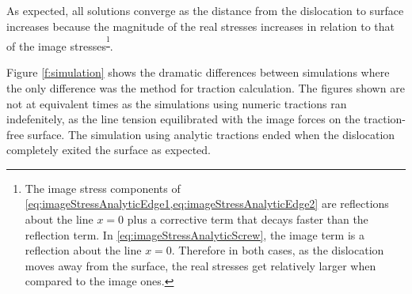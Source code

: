 \documentclass[11pt]{iopart}
\begin{document}
As expected, all solutions converge as the distance from the dislocation to surface increases because the magnitude of the real stresses increases in relation to that of the image stresses\textsuperscript{\footnote{The image stress components of \cref{eq:imageStressAnalyticEdge1,eq:imageStressAnalyticEdge2} are reflections about the line $x=0$ plus a corrective term that decays faster than the reflection term. In \cref{eq:imageStressAnalyticScrew}, the image term is a reflection about the line $x=0$. Therefore in both cases, as the dislocation moves away from the surface, the real stresses get relatively larger when compared to the image ones.}}.

Figure \cref{f:simulation} shows the dramatic differences between simulations where the only difference was the method for traction calculation. The figures shown are not at equivalent times as the simulations using numeric tractions ran indefenitely, as the line tension equilibrated with the image forces on the traction-free surface. The simulation using analytic tractions ended when the dislocation completely exited the surface as expected.
\end{document}
